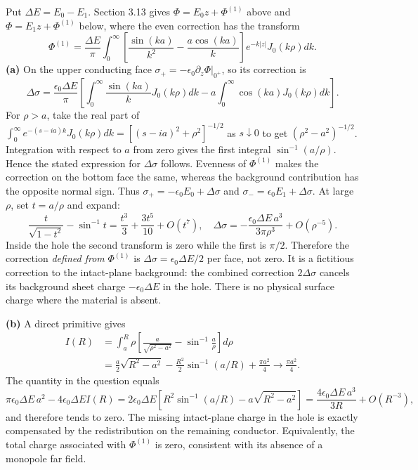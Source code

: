 Put $\Delta E=E_0-E_1$.  Section 3.13 gives
$\Phi=E_0z+\Phi^{(1)}$ above and $\Phi=E_1z+\Phi^{(1)}$ below,
where the even correction has the transform
\[
\Phi^{(1)}=\frac{\Delta E}{\pi}\int_0^\infty
\left[\frac{\sin(ka)}{k^2}-\frac{a\cos(ka)}k\right]
e^{-k|z|}J_0(k\rho)dk.
\]
\textbf{(a)} On the upper conducting face
$\sigma_+=-\epsilon_0\partial_z\Phi|_{0^+}$, so its correction is
\[
\Delta\sigma=\frac{\epsilon_0\Delta E}{\pi}
\left[\int_0^\infty\frac{\sin(ka)}kJ_0(k\rho)dk
-a\int_0^\infty\cos(ka)J_0(k\rho)dk\right].
\]
For $\rho>a$, take the real part of
$\int_0^\infty e^{-(s-ia)k}J_0(k\rho)dk
=[(s-ia)^2+\rho^2]^{-1/2}$ as $s\downarrow0$ to get
$(\rho^2-a^2)^{-1/2}$.  Integration with respect to $a$ from zero
gives the first integral $\sin^{-1}(a/\rho)$.
Hence the stated expression for $\Delta\sigma$ follows.
Evenness of $\Phi^{(1)}$ makes the correction on the bottom face
the same, whereas the background contribution has the opposite
normal sign.  Thus $\sigma_+=-\epsilon_0E_0+\Delta\sigma$ and
$\sigma_-=\epsilon_0E_1+\Delta\sigma$.
At large $\rho$, set $t=a/\rho$ and expand:
\[
\frac{t}{\sqrt{1-t^2}}-\sin^{-1}t
=\frac{t^3}3+\frac{3t^5}{10}+O(t^7),\quad
\Delta\sigma=-\frac{\epsilon_0\Delta E\,a^3}{3\pi\rho^3}
+O(\rho^{-5}).
\]
Inside the hole the second transform is zero while the first is
$\pi/2$.  Therefore the correction \emph{defined from}
$\Phi^{(1)}$ is $\Delta\sigma=\epsilon_0\Delta E/2$ per face,
not zero.  It is a fictitious correction to the intact-plane
background: the combined correction $2\Delta\sigma$ cancels its
background sheet charge $-\epsilon_0\Delta E$ in the hole.
There is no physical surface charge where the material is absent.

\textbf{(b)} A direct primitive gives
\begin{align*}
I(R)&=\int_a^R\rho\left[
\frac a{\sqrt{\rho^2-a^2}}-\sin^{-1}\frac a\rho\right]d\rho\\
&=\frac a2\sqrt{R^2-a^2}-\frac{R^2}2\sin^{-1}(a/R)
+\frac{\pi a^2}4\longrightarrow\frac{\pi a^2}4.
\end{align*}
The quantity in the question equals
\[
\pi\epsilon_0\Delta E\,a^2-4\epsilon_0\Delta E I(R)
=2\epsilon_0\Delta E\left[R^2\sin^{-1}(a/R)
-a\sqrt{R^2-a^2}\right]
=\frac{4\epsilon_0\Delta E\,a^3}{3R}+O(R^{-3}),
\]
and therefore tends to zero.  The missing intact-plane charge in
the hole is exactly compensated by the redistribution on the
remaining conductor.  Equivalently, the total charge associated
with $\Phi^{(1)}$ is zero, consistent with its absence of a monopole
far field.

